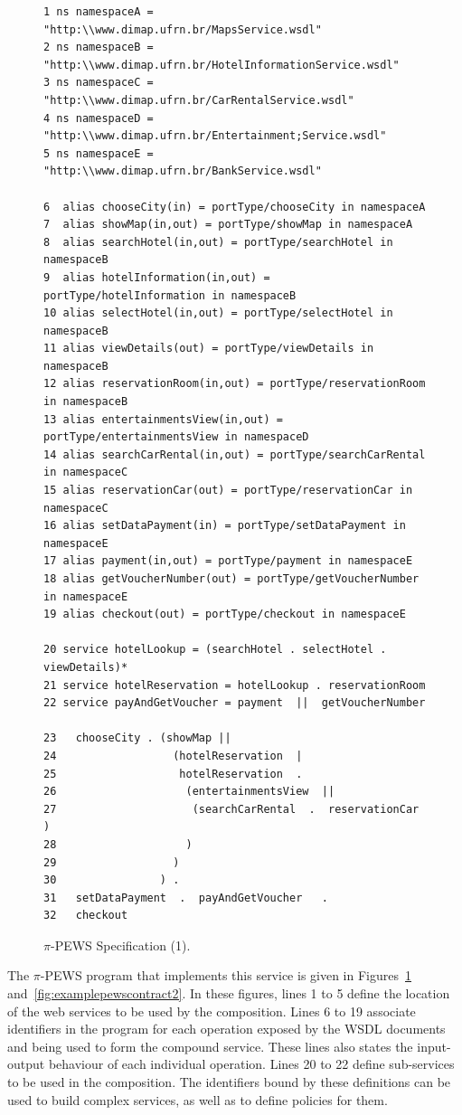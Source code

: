 \documentclass{sig-alternate}
\begin{document}
\begin{figure}[ht]
\centering
\tiny
\begin{verbatim}
1 ns namespaceA = "http:\\www.dimap.ufrn.br/MapsService.wsdl"
2 ns namespaceB = "http:\\www.dimap.ufrn.br/HotelInformationService.wsdl"
3 ns namespaceC = "http:\\www.dimap.ufrn.br/CarRentalService.wsdl"
4 ns namespaceD = "http:\\www.dimap.ufrn.br/Entertainment;Service.wsdl"
5 ns namespaceE = "http:\\www.dimap.ufrn.br/BankService.wsdl"

6  alias chooseCity(in) = portType/chooseCity in namespaceA
7  alias showMap(in,out) = portType/showMap in namespaceA
8  alias searchHotel(in,out) = portType/searchHotel in namespaceB
9  alias hotelInformation(in,out) = portType/hotelInformation in namespaceB
10 alias selectHotel(in,out) = portType/selectHotel in namespaceB
11 alias viewDetails(out) = portType/viewDetails in namespaceB
12 alias reservationRoom(in,out) = portType/reservationRoom in namespaceB
13 alias entertainmentsView(in,out) = portType/entertainmentsView in namespaceD
14 alias searchCarRental(in,out) = portType/searchCarRental in namespaceC
15 alias reservationCar(out) = portType/reservationCar in namespaceC
16 alias setDataPayment(in) = portType/setDataPayment in namespaceE
17 alias payment(in,out) = portType/payment in namespaceE
18 alias getVoucherNumber(out) = portType/getVoucherNumber in namespaceE
19 alias checkout(out) = portType/checkout in namespaceE

20 service hotelLookup = (searchHotel . selectHotel . viewDetails)*
21 service hotelReservation = hotelLookup . reservationRoom
22 service payAndGetVoucher = payment  ||  getVoucherNumber

23   chooseCity . (showMap ||
24                  (hotelReservation  |
25                   hotelReservation  .
26                    (entertainmentsView  ||
27                     (searchCarRental  .  reservationCar )
28                    )
29                  )
30                ) .
31   setDataPayment  .  payAndGetVoucher   .
32   checkout
\end{verbatim}

\caption{$\pi$-PEWS Specification (1).}
\label{fig:examplepewscontract}
\end{figure}


The $\pi$-PEWS program that implements this service is given in Figures~\ref{fig:examplepewscontract} and~\ref{fig:examplepewscontract2}.
In these figures, lines 1 to 5 define the location of the web services to be used by the composition.
Lines 6 to 19 associate identifiers in the program for each operation exposed by
the WSDL documents and being used to form the compound service. These lines also states the input-output behaviour of each individual operation.
Lines 20 to 22 define sub-services to be used in the composition. The identifiers bound by these definitions can be used to build complex services, as well as to define policies for them.
\end{document}
